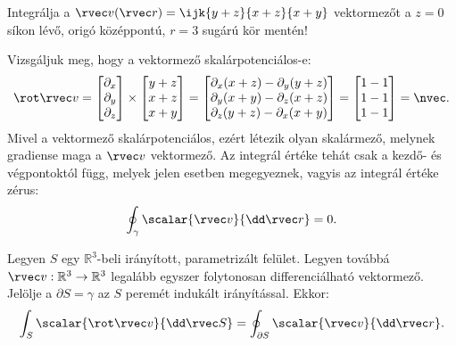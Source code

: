 \documentclass[a4paper, 12pt]{scrartcl}
\newcommand\arcv{\rvec r}
\begin{document}
\begin{example}
  Integrálja a $\rvec v(\rvec r) = \ijk{y + z}{x + z}{x + y}$ vektormezőt
  a $z = 0$ síkon lévő, origó középpontú, $r = 3$ sugárú kör mentén!

  Vizsgáljuk meg, hogy a vektormező skalárpotenciálos-e:
  $$
    \rot \rvec v
    =
    \begin{bmatrix}
      \partial_x \\ \partial_y \\ \partial_z
    \end{bmatrix}
    \times
    \begin{bmatrix}
      y + z \\ x + z \\ x + y
    \end{bmatrix}
    =
    \begin{bmatrix}
      \partial_x (x + z) - \partial_y (y + z) \\
      \partial_y (x + y) - \partial_z (x + z) \\
      \partial_z (y + z) - \partial_x (x + y)
    \end{bmatrix}
    =
    \begin{bmatrix}
      1 - 1 \\ 1 - 1 \\ 1 - 1
    \end{bmatrix}
    =
    \nvec
    \text.
  $$
  Mivel a vektormező skalárpotenciálos, ezért létezik olyan skalármező,
  melynek gradiense maga a $\rvec v$ vektormező. Az integrál értéke tehát
  csak a kezdő- és végpontoktól függ, melyek jelen esetben megegyeznek,
  vagyis az integrál értéke zérus:
  $$
    \oint_\gamma \scalar{\rvec v}{\dd \arcv} = 0
    \text.
  $$
\end{example}

\begin{theorem}
  Legyen $S$ egy $\mathbb R^3$-beli irányított, parametrizált felület.
  Legyen továbbá $\rvec v : \mathbb R^3 \rightarrow \mathbb R^3$ legalább
  egyszer folytonosan differenciálható vektormező. Jelölje a $\partial S =
    \gamma$ az $S$ peremét indukált irányítással. Ekkor:
  $$
    \int_S \scalar{\rot \rvec v}{\dd \rvec S}
    =
    \oint_{\partial S} \scalar{\rvec v}{\dd \rvec r}
    \text.
  $$
\end{theorem}
\end{document}
